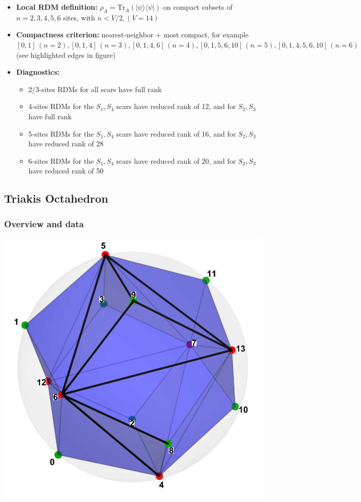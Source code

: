 \documentclass[11pt,a4paper]{article}
\begin{document}
\begin{itemize}[leftmargin=1.5em]
  \item \textbf{Local RDM definition:} $\rho_A=\mathrm{Tr}_{\bar A}(|\psi\rangle\langle\psi|)$ on compact subsets of $n=2,3,4,5,6$ sites, with $n < V/2, (V=14)$
  \item \textbf{Compactness criterion:} nearest-neighbor + most compact, for example $[0,1] \, (n = 2), [0,1,4] \, (n = 3), [0,1,4,6] \,  (n = 4), [0,1,5,6,10] \, (n = 5), [0,1,4,5,6,10] \, (n = 6)$ (see highlighted edges in figure)
  \item \textbf{Diagnostics:} \begin{itemize} \item 2/3-sites RDMs for all scars have full rank \item 4-sites RDMs for the $S_1,S_4$ scars have reduced rank of 12, and for $S_2,S_3$ have full rank \item 5-sites RDMs for the $S_1,S_4$ scars have reduced rank of 16, and for $S_2,S_3$ have reduced rank of 28 \item 6-sites RDMs for the $S_1,S_4$ scars have reduced rank of 20, and for $S_2,S_3$ have reduced rank of 50 \end{itemize}
\end{itemize}


\subsection*{Triakis Octahedron}

\subsubsection*{Overview and data}
\begin{center}
  \includegraphics[width=.6\linewidth]{triakisoctahedron}
\end{center}
\end{document}
